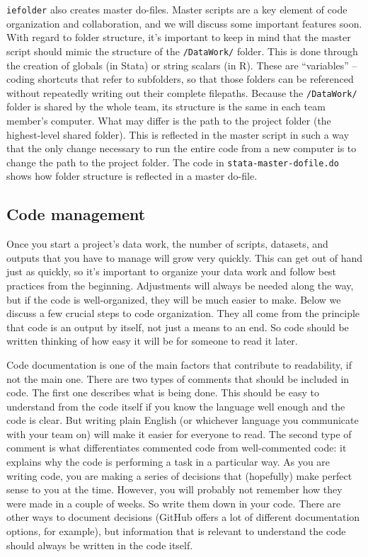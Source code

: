 \texttt{iefolder} also creates master do-files.
Master scripts are a key element of code organization and collaboration,
and we will discuss some important features soon.
With regard to folder structure, it's important to keep in mind
that the master script should mimic the structure of the \texttt{/DataWork/} folder.
This is done through the creation of globals (in Stata) or string scalars (in R).
These are ``variables'' -- coding shortcuts that refer to subfolders,
so that those folders can be referenced without repeatedly writing out their complete filepaths.
Because the \texttt{/DataWork/} folder is shared by the whole team,
its structure is the same in each team member's computer.
What may differ is the path to the project folder (the highest-level shared folder).
This is reflected in the master script in such a way that
the only change necessary to run the entire code from a new computer
is to change the path to the project folder.
The code in \texttt{stata-master-dofile.do} shows how folder structure is reflected in a master do-file.


\subsection{Code management}

Once you start a project's data work,
the number of scripts, datasets, and outputs that you have to manage will grow very quickly.
This can get out of hand just as quickly,
so it's important to organize your data work and follow best practices from the beginning.
Adjustments will always be needed along the way,
but if the code is well-organized, they will be much easier to make.
Below we discuss a few crucial steps to code organization.
They all come from the principle that code is an output by itself,
not just a means to an end.
So code should be written thinking of how easy it will be for someone to read it later.

Code documentation is one of the main factors that contribute to readability,
if not the main one.
There are two types of comments that should be included in code.
The first one describes what is being done.
This should be easy to understand from the code itself if you know the language well enough and the code is clear.
But writing plain English (or whichever language you communicate with your team on)
will make it easier for everyone to read.
The second type of comment is what differentiates commented code from well-commented code:
it explains why the code is performing a task in a particular way.
As you are writing code, you are making a series of decisions that
(hopefully) make perfect sense to you at the time.
However, you will probably not remember how they were made in a couple of weeks.
So write them down in your code.
There are other ways to document decisions
(GitHub offers a lot of different documentation options, for example),
but information that is relevant to understand the code should always be written in the code itself.

